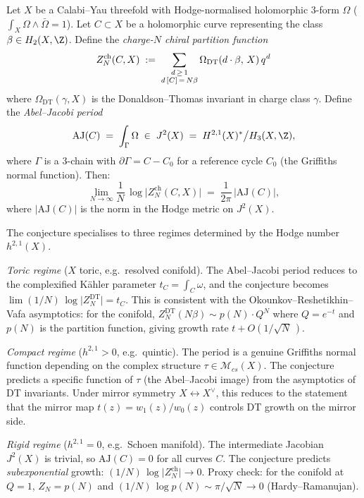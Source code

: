 \begin{conjecture}
\label{conj:chiral-volume-conjecture}
\ClaimStatusConjectured
Let $X$ be a Calabi--Yau threefold with Hodge-normalised holomorphic
$3$-form $\Omega$ ($\int_X \Omega \wedge \bar\Omega = 1$). Let
$C \subset X$ be a holomorphic curve representing the class
$\beta \in H_2(X, \Z)$. Define the \emph{charge-$N$ chiral partition
function}
\[
 Z_N^{\mathrm{ch}}(C, X)
 \;:=\;
 \sum_{\substack{d \,\geq\, 1 \\ d\,[\hspace{0.2pt}C\hspace{0.2pt}]\,=\, N\beta}}
 \Omega_{\mathrm{DT}}(d \cdot \beta,\, X)\, q^{\hspace{0.3pt}d}
\]
where $\Omega_{\mathrm{DT}}(\gamma, X)$ is the Donaldson--Thomas
invariant in charge class $\gamma$. Define the \emph{Abel--Jacobi
period}
\[
 \mathrm{AJ}(C)
 \;=\; \int_\Gamma \Omega
 \;\in\; J^2(X) \;=\; H^{2,1}(X)^* \big/ H_3(X, \Z),
\]
where $\Gamma$ is a $3$-chain with $\partial\Gamma = C - C_0$ for a
reference cycle $C_0$ \textup{(}the Griffiths normal function\textup{)}.
Then:
\begin{equation}\label{eq:chiral-volume-conjecture}
 \lim_{N \to \infty} \frac{1}{N}\,
 \log\bigl\lvert Z_N^{\mathrm{ch}}(C, X) \bigr\rvert
 \;=\;
 \frac{1}{2\pi}\,\bigl\lvert \mathrm{AJ}(C) \bigr\rvert,
\end{equation}
where $\lvert\mathrm{AJ}(C)\rvert$ is the norm in the Hodge metric on
$J^2(X)$.
\end{conjecture}

\begin{remark}
\label{rem:chiral-volume-three-regimes}
The conjecture specialises to three regimes determined by the Hodge
number $h^{2,1}(X)$.

\emph{Toric regime} ($X$ toric, e.g.\ resolved conifold). The
Abel--Jacobi period reduces to the complexified K\"ahler parameter
$t_C = \int_C \omega$, and the conjecture becomes
$\lim (1/N)\,\log\lvert Z_N^{\mathrm{DT}}\rvert = t_C$. This is
consistent with the Okounkov--Reshetikhin--Vafa asymptotics: for the
conifold, $Z_N^{\mathrm{DT}}(N\beta) \sim p(N)\cdot Q^N$ where
$Q = e^{-t}$ and $p(N)$ is the partition function, giving growth rate
$t + O(1/\!\sqrt{N}\,)$.

\emph{Compact regime} ($h^{2,1} > 0$, e.g.\ quintic). The period is a
genuine Griffiths normal function depending on the complex structure
$\tau \in \mathcal{M}_{cs}(X)$. The conjecture predicts a specific
function of $\tau$ (the Abel--Jacobi image) from the
asymptotics of DT invariants. Under mirror symmetry $X \leftrightarrow
X^\vee$, this reduces to the statement that the mirror map
$t(z) = w_1(z)/w_0(z)$ controls DT growth on the mirror side.

\emph{Rigid regime} ($h^{2,1} = 0$, e.g.\ Schoen manifold). The
intermediate Jacobian $J^2(X)$ is trivial, so $\mathrm{AJ}(C) = 0$ for
all curves $C$. The conjecture predicts \emph{subexponential} growth:
$(1/N)\,\log\lvert Z_N^{\mathrm{ch}}\rvert \to 0$. Proxy check: for the
conifold at $Q = 1$, $Z_N = p(N)$ and
$(1/N)\,\log p(N) \sim \pi/\!\sqrt{N} \to 0$ (Hardy--Ramanujan).
\end{remark}

